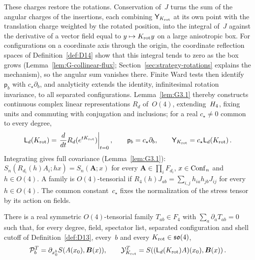 These charges restore the rotations. Conservation of~$J$ turns the sum of the angular charges of the insertions, each combining $\mathsf Y_{K_{\rm rot}}$ at its own point with the translation charge weighted by the rotated position, into the integral of~$J$ against the derivative of a vector field equal to $y\mapsto K_{\rm rot}y$ on a large anisotropic box. For configurations on a coordinate axis through the origin, the coordinate reflection spaces of Definition~\ref{def:D14} show that this integral tends to zero as the box grows (Lemma~\ref{lem:G-collinear-flux}; Section~\ref{sec:strategy-rotations} explains the mechanism), so the angular sum vanishes there. Finite Ward tests then identify $\mathsf p_b$ with $c_\star\partial_b$, and analyticity extends the identity, infinitesimal rotation invariance, to all separated configurations. Lemma~\ref{lem:G3.1} thereby constructs continuous complex linear representations $R_d$ of~$O(4)$, extending~$H_4$, fixing units and commuting with conjugation and inclusions; for a real $c_\star\ne0$ common to every degree,
\begin{equation*}
\mathsf L_d(K_{\rm rot})=\left.\frac{d}{dt}R_d(e^{tK_{\rm rot}})\right|_{t=0},
\qquad \mathsf p_b=c_\star\partial_b,\qquad
\mathsf Y_{K_{\rm rot}}=c_\star\mathsf L_d(K_{\rm rot})\,.
\end{equation*}
Integrating gives full covariance (Lemma~\ref{lem:G3.1}): $S_n(R_{d_i}(h)A_i;hx)=S_n(\boldsymbol A;x)$ for every $\boldsymbol A\in\prod_iF_{d_i}$, $x\in\mathrm{Conf}_{n}$ and $h\in O(4)$. A family is $O(4)$-tensorial if $R_4(h)J_{ab}=\sum_{i,j}h_{ia}h_{jb}J_{ij}$ for every $h\in O(4)$. The common constant~$c_\star$ fixes the normalization of the stress tensor by its action on fields.

\begin{theorem}\label{prop:ST}\label{thm:ST}
There is a real symmetric $O(4)$-tensorial family $T_{ab}\in F_4$ with $\sum_a\partial_aT_{ab}=0$ such that, for every degree, field, spectator list, separated configuration and shell cutoff of Definition~\ref{def:D13}, every~$b$ and every $K_{\rm rot}\in\mathfrak{so}(4)$,
\begin{equation*}
\mathcal P_b^T=\partial_{x_0^b}S(A(x_0),\boldsymbol B(x)),\qquad
\mathcal Y_{K_{\rm rot}}^T=S((\mathsf L_d(K_{\rm rot})A)(x_0),\boldsymbol B(x))\,.
\end{equation*}
\end{theorem}


